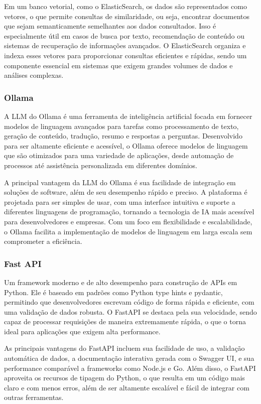 \documentclass[a4paper, 12pt]{article}
\begin{document}
    Em um banco vetorial, como o ElasticSearch, os dados são representados como vetores, o que permite consultas de similaridade, ou seja, encontrar documentos que sejam semanticamente semelhantes aos dados consultados. Isso é especialmente útil em casos de busca por texto, recomendação de conteúdo ou sistemas de recuperação de informações avançados. O ElasticSearch organiza e indexa esses vetores para proporcionar consultas eficientes e rápidas, sendo um componente essencial em sistemas que exigem grandes volumes de dados e análises complexas.

    \subsubsection{Ollama}
    A LLM do Ollama é uma ferramenta de inteligência artificial focada em fornecer modelos de linguagem avançados para tarefas como processamento de texto, geração de conteúdo, tradução, resumo e respostas a perguntas. Desenvolvido para ser altamente eficiente e acessível, o Ollama oferece modelos de linguagem que são otimizados para uma variedade de aplicações, desde automação de processos até assistência personalizada em diferentes domínios.

    A principal vantagem da LLM do Ollama é sua facilidade de integração em soluções de software, além de seu desempenho rápido e preciso. A plataforma é projetada para ser simples de usar, com uma interface intuitiva e suporte a diferentes linguagens de programação, tornando a tecnologia de IA mais acessível para desenvolvedores e empresas. Com um foco em flexibilidade e escalabilidade, o Ollama facilita a implementação de modelos de linguagem em larga escala sem comprometer a eficiência.

    \subsubsection{Fast API}
    Um framework moderno e de alto desempenho para construção de APIs em Python. Ele é baseado em padrões como Python type hints e pydantic, permitindo que desenvolvedores escrevam código de forma rápida e eficiente, com uma validação de dados robusta. O FastAPI se destaca pela sua velocidade, sendo capaz de processar requisições de maneira extremamente rápida, o que o torna ideal para aplicações que exigem alta performance.

    As principais vantagens do FastAPI incluem sua facilidade de uso, a validação automática de dados, a documentação interativa gerada com o Swagger UI, e sua performance comparável a frameworks como Node.js e Go. Além disso, o FastAPI aproveita os recursos de tipagem do Python, o que resulta em um código mais claro e com menos erros, além de ser altamente escalável e fácil de integrar com outras ferramentas.
\end{document}
